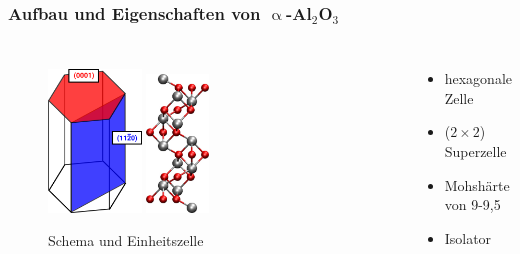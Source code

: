 \documentclass[hyperref={pdfpagelabels=false}]{beamer}
\begin{document}
\begin{frame}
 \frametitle{Aufbau und Eigenschaften von $\upalpha$-Al$_2$O$_3$}
 \begin{columns}
  \begin{figure}
  \centering
  \includegraphics[width=0.3\textwidth]{figures/al2o3-crystal.png}
  \includegraphics[width=0.2\textwidth]{figures/bulk_UC.jpg}
  \caption{Schema und Einheitszelle}
  \end{figure}
  \begin{itemize}
  \item hexagonale Zelle
  \item ($2\times 2$) Superzelle
  \item Mohshärte von 9-9,5
  \item Isolator
  \end{itemize}
 \end{columns}
 \pause
 \vspace{-.3cm}
\begin{columns}
  \begin{figure}

\end{figure}
\end{columns}
\end{frame}
\end{document}
